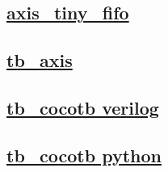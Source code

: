 \documentclass{article}
\begin{document}
  


  \subsection{\href{../files/axis_tiny_fifo-v.html}{axis\_tiny\_fifo}}
  \subsection{\href{../files2/tb_axis-v.html}{tb\_axis}}
  \subsection{\href{../files2/tb_cocotb-v.html}{tb\_cocotb verilog}}
  \subsection{\href{../files2/tb_cocotb-py.html}{tb\_cocotb python}}
\end{document}
